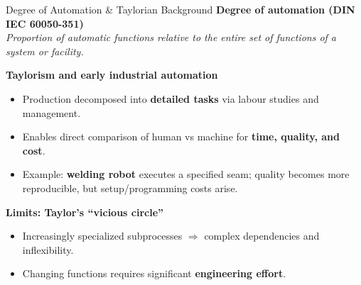 \begin{frame}{Degree of Automation \& Taylorian Background}
\textbf{Degree of automation (DIN IEC 60050-351)}\\
\emph{Proportion of automatic functions relative to the entire set of functions of a system or facility.}

\vspace{2mm}
\textbf{Taylorism and early industrial automation}
\begin{itemize}
  \item Production decomposed into \textbf{detailed tasks} via labour studies and management.
  \item Enables direct comparison of human vs machine for \textbf{time, quality, and cost}.
  \item Example: \textbf{welding robot} executes a specified seam; quality becomes more reproducible, but setup/programming costs arise.
\end{itemize}

\vspace{1mm}
\textbf{Limits: Taylor's ``vicious circle''}
\begin{itemize}
  \item Increasingly specialized subprocesses $\Rightarrow$ complex dependencies and inflexibility.
  \item Changing functions requires significant \textbf{engineering effort}.
\end{itemize}
\end{frame}


